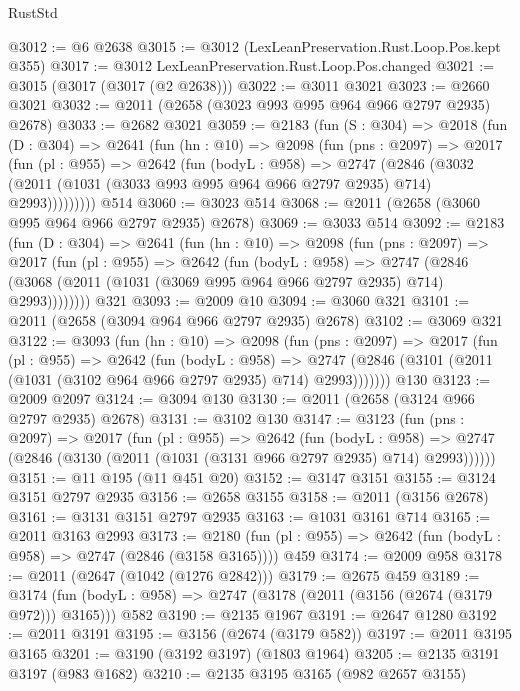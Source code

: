 \begin{lexlean}{RustStd}
\begin{coremodule}
@3012 := @6 @2638
@3015 := @3012 (LexLeanPreservation.Rust.Loop.Pos.kept @355)
@3017 := @3012 LexLeanPreservation.Rust.Loop.Pos.changed
@3021 := @3015 (@3017 (@3017 (@2 @2638)))
@3022 := @3011 @3021
@3023 := @2660 @3021
@3032 := @2011 (@2658 (@3023 @993 @995 @964 @966 @2797 @2935) @2678)
@3033 := @2682 @3021
@3059 := @2183
    (fun (S : @304) =>
    @2018
      (fun (D : @304) =>
      @2641
        (fun (hn : @10) =>
        @2098
          (fun (pns : @2097) =>
          @2017
            (fun (pl : @955) =>
            @2642
              (fun (bodyL : @958) =>
              @2747
                (@2846
                  (@3032 (@2011 (@1031 (@3033 @993 @995 @964 @966 @2797 @2935) @714) @2993)))))))))
    @514
@3060 := @3023 @514
@3068 := @2011 (@2658 (@3060 @995 @964 @966 @2797 @2935) @2678)
@3069 := @3033 @514
@3092 := @2183
    (fun (D : @304) =>
    @2641
      (fun (hn : @10) =>
      @2098
        (fun (pns : @2097) =>
        @2017
          (fun (pl : @955) =>
          @2642
            (fun (bodyL : @958) =>
            @2747 (@2846 (@3068 (@2011 (@1031 (@3069 @995 @964 @966 @2797 @2935) @714) @2993))))))))
    @321
@3093 := @2009 @10
@3094 := @3060 @321
@3101 := @2011 (@2658 (@3094 @964 @966 @2797 @2935) @2678)
@3102 := @3069 @321
@3122 := @3093
    (fun (hn : @10) =>
    @2098
      (fun (pns : @2097) =>
      @2017
        (fun (pl : @955) =>
        @2642
          (fun (bodyL : @958) =>
          @2747 (@2846 (@3101 (@2011 (@1031 (@3102 @964 @966 @2797 @2935) @714) @2993)))))))
    @130
@3123 := @2009 @2097
@3124 := @3094 @130
@3130 := @2011 (@2658 (@3124 @966 @2797 @2935) @2678)
@3131 := @3102 @130
@3147 := @3123
    (fun (pns : @2097) =>
    @2017
      (fun (pl : @955) =>
      @2642
        (fun (bodyL : @958) =>
        @2747 (@2846 (@3130 (@2011 (@1031 (@3131 @966 @2797 @2935) @714) @2993))))))
@3151 := @11 @195 (@11 @451 @20)
@3152 := @3147 @3151
@3155 := @3124 @3151 @2797 @2935
@3156 := @2658 @3155
@3158 := @2011 (@3156 @2678)
@3161 := @3131 @3151 @2797 @2935
@3163 := @1031 @3161 @714
@3165 := @2011 @3163 @2993
@3173 := @2180 (fun (pl : @955) => @2642 (fun (bodyL : @958) => @2747 (@2846 (@3158 @3165)))) @459
@3174 := @2009 @958
@3178 := @2011 (@2647 (@1042 (@1276 @2842)))
@3179 := @2675 @459
@3189 := @3174 (fun (bodyL : @958) => @2747 (@3178 (@2011 (@3156 (@2674 (@3179 @972))) @3165))) @582
@3190 := @2135 @1967
@3191 := @2647 @1280
@3192 := @2011 @3191
@3195 := @3156 (@2674 (@3179 @582))
@3197 := @2011 @3195 @3165
@3201 := @3190 (@3192 @3197) (@1803 @1964)
@3205 := @2135 @3191 @3197 (@983 @1682)
@3210 := @2135 @3195 @3165 (@982 @2657 @3155)

\end{coremodule}
\end{lexlean}
